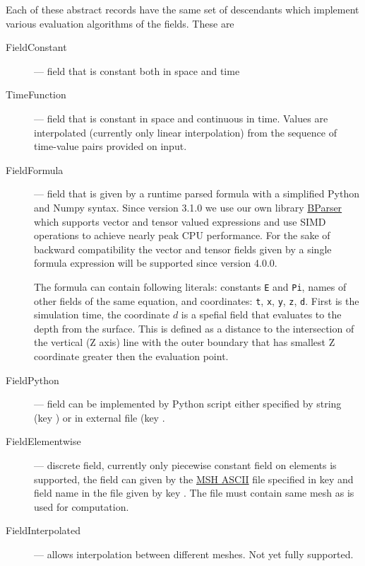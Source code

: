 Each of these abstract records have the same set of descendants which implement various evaluation algorithms of the fields. These are
\begin{description}
 \item[FieldConstant] --- field that is constant both in space and time
 \item[TimeFunction] --- field that is constant in space and continuous in time. Values are interpolated (currently only linear interpolation) from 
 the sequence of time-value pairs provided on input.
 \item[FieldFormula] --- field that is given by a runtime parsed formula with a simplified Python and Numpy syntax. Since version 3.1.0 we use our own library \href{https://github.com/flow123d/bparser}{BParser} which supports vector and tensor valued expressions and use SIMD operations to achieve nearly peak CPU performance. 
 For the sake of backward compatibility the vector and tensor fields given by a single formula expression will be supported since version 4.0.0.
 
 The formula can contain following literals: constants {\tt E} and {\tt Pi}, names of other fields of the same equation, and coordinates: {\tt t}, {\tt x}, {\tt y}, {\tt z}, {\tt d}. First is the 
 simulation time, the coordinate $d$ is a spefial field that evaluates to the depth from the surface. This is defined as a distance to the intersection of the vertical (Z axis) line with the outer boundary that has smallest Z coordinate greater then the evaluation point.

 \item[FieldPython] --- field can be implemented by Python script either specified by string (key ) 
 or in external file (key . 
 \item[FieldElementwise] --- discrete field, currently only piecewise constant field on elements is supported, the field can given by 
 the \href{http://geuz.org/gmsh/doc/texinfo/gmsh.html#MSH-ASCII-file-format}{MSH ASCII} file specified in key  and field name in the file given 
 by key . The file must contain same mesh as is used for computation.
 \item[FieldInterpolated] --- allows interpolation between different meshes. Not yet fully supported.
\end{description}


